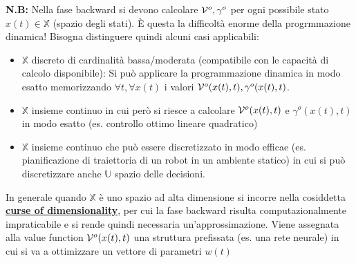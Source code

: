 \begin{center}
\end{center}
\textbf{N.B:} Nella fase backward si devono calcolare $\mathcal{V}^o, \gamma^o$ per ogni possibile stato $x(t) \in \mathbb{X}$ (spazio degli stati). \`E questa la difficolt\`a enorme della progrmmazione dinamica! Bisogna distinguere quindi alcuni casi applicabili:
\begin{itemize}
\item $\mathbb{X}$ discreto di cardinalit\`a bassa/moderata (compatibile con le capacit\`a di calcolo disponibile): Si pu\`o applicare la programmazione dinamica in modo esatto memorizzando $\forall t, \forall x(t)$ i valori $\mathcal{V}^o(x(t),t), \gamma^o(x(t), t)$.
\item $\mathbb{X}$ insieme continuo in cui per\`o si riesce a calcolare $\mathcal{V}^o(x(t), t)$ e $\gamma^o(x(t),t)$ in modo esatto (es. controllo ottimo lineare quadratico)
\item $\mathbb{X}$ insieme continuo che pu\`o essere discretizzato in modo efficae (es. pianificazione di traiettoria di un robot in un ambiente statico) in cui si pu\`o discretizzare anche $\mathbb{U}$ spazio delle decisioni.
\end{itemize}
In generale quando $\mathbb{X}$ \`e uno spazio ad alta dimensione si incorre nella cosiddetta \href{https://en.wikipedia.org/wiki/Curse_of_dimensionality}\textbf{curse of dimensionality}, per cui la fase backward risulta computazionalmente impraticabile e si rende quindi necessaria un'approssimazione. Viene assegnata alla value function $\mathcal{V}^o(x(t),t)$ una struttura prefissata (es. una rete neurale) in cui si va a ottimizzare un vettore di parametri $w(t)$
